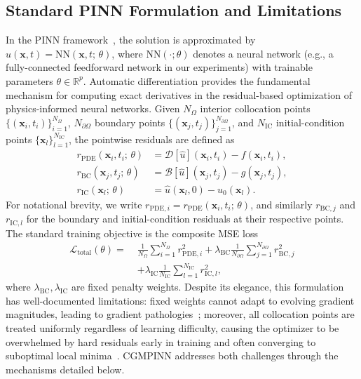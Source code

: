 \documentclass{article}
\theoremstyle{plain}
\theoremstyle{definition}
\theoremstyle{remark}
\begin{document}
	\subsection{Standard PINN Formulation and Limitations}
	
	In the PINN framework~\cite{PINN_Raissi1}, the solution is approximated by
	$\hat{u}(\boldsymbol{x},t)=\mathrm{NN}(\boldsymbol{x},t;\,\theta)$,
	where $\mathrm{NN}(\cdot;\theta)$ denotes a neural network
	(e.g., a fully-connected feedforward network in our experiments)
	with trainable parameters $\theta\in\mathbb{R}^p$.
	Automatic differentiation \cite{Baydin44} provides the fundamental mechanism for computing exact derivatives in the residual-based optimization of physics-informed neural networks.
	Given $N_\Omega$ interior collocation points
	$\{(\boldsymbol{x}_i,t_i)\}_{i=1}^{N_\Omega}$,
	$N_{\partial\Omega}$ boundary points
	$\{(\boldsymbol{x}_j,t_j)\}_{j=1}^{N_{\partial\Omega}}$,
	and $N_{\mathrm{IC}}$ initial-condition points
	$\{\boldsymbol{x}_l\}_{l=1}^{N_{\mathrm{IC}}}$,
	the pointwise residuals are defined as
	\begin{align}
		r_{\mathrm{PDE}}(\boldsymbol{x}_i,t_i;\,\theta)
		&= \mathcal{D}[\hat{u}](\boldsymbol{x}_i,t_i)
		- f(\boldsymbol{x}_i,t_i),
		\label{eq:res_pde}\\
		r_{\mathrm{BC}}(\boldsymbol{x}_j,t_j;\,\theta)
		&= \mathcal{B}[\hat{u}](\boldsymbol{x}_j,t_j)
		- g(\boldsymbol{x}_j,t_j),
		\label{eq:res_bc}\\
		r_{\mathrm{IC}}(\boldsymbol{x}_l;\,\theta)
		&= \hat{u}(\boldsymbol{x}_l,0) - u_0(\boldsymbol{x}_l).
		\label{eq:res_ic}
	\end{align}
	For notational brevity, we write
	$r_{\mathrm{PDE},i} = r_{\mathrm{PDE}}(\boldsymbol{x}_i,t_i;\,\theta)$,
	and similarly $r_{\mathrm{BC},j}$ and $r_{\mathrm{IC},l}$ for the
	boundary and initial-condition residuals at their respective points.
	The standard training objective is the composite MSE loss
	\begin{equation}
		\begin{split}
			\mathcal{L}_{\mathrm{total}}(\theta)
			=\;&\frac{1}{N_\Omega}\sum_{i=1}^{N_\Omega}r_{\mathrm{PDE},i}^{2}
			+\lambda_{\mathrm{BC}}
			\frac{1}{N_{\partial\Omega}}
			\sum_{j=1}^{N_{\partial\Omega}}r_{\mathrm{BC},j}^{2}\\
			&+\lambda_{\mathrm{IC}}
			\frac{1}{N_{\mathrm{IC}}}
			\sum_{l=1}^{N_{\mathrm{IC}}}r_{\mathrm{IC},l}^{2},
		\end{split}
		\label{eq:standard_pinn_loss}
	\end{equation}
	where $\lambda_{\mathrm{BC}},\lambda_{\mathrm{IC}}$ are fixed penalty
	weights. Despite its elegance, this formulation has well-documented
	limitations: fixed weights cannot adapt to evolving gradient magnitudes,
	leading to gradient pathologies~\cite{Wang16}; moreover, all collocation
	points are treated uniformly regardless of learning difficulty, causing
	the optimizer to be overwhelmed by hard residuals early in training and
	often converging to suboptimal local minima~\cite{Krishnapriyan18}.
	CGMPINN addresses both challenges through the mechanisms detailed below.
	
\end{document}
